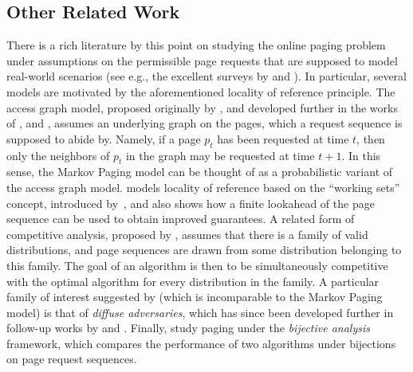 \subsection{Other Related Work}
\label{sec:related-work}



There is a rich literature by this point on studying the online paging problem under assumptions on the permissible page requests that are supposed to model real-world scenarios (see e.g., the excellent surveys by \cite{irani2005competitive} and \cite{dorrigiv2005survey}). In particular, several models are motivated by the aforementioned locality of reference principle. The access graph model, proposed originally by \cite{borodin1991competitive}, and developed further in the works of \cite{irani1992strongly}, \cite{fiat1995randomized} and \cite{fiat1997truly}, assumes an underlying graph on the pages, which a request sequence is supposed to abide by. Namely, if a page $p_t$ has been requested at time $t$, then only the neighbors of $p_t$ in the graph may be requested at time $t+1$. In this sense, the Markov Paging model can be thought of as a probabilistic variant of the access graph model.
\cite{torng1998unified} models locality of reference based on the ``working sets'' concept, introduced by~\cite{denning1968working}, and also shows how a finite lookahead of the page sequence can be used to obtain improved guarantees. A related form of competitive analysis, proposed by \cite{koutsoupias2000beyond}, assumes that there is a family of valid distributions, and page sequences are drawn from some distribution belonging to this family. The goal of an algorithm is then to be simultaneously competitive with the optimal algorithm for every distribution in the family. A particular family of interest suggested by \cite{koutsoupias2000beyond} (which is incomparable to the Markov Paging model) is that of \textit{diffuse adversaries}, which has since been developed further in follow-up works by \cite{young1998bounding, young2000line} and \cite{becchetti2004modeling}. Finally, \cite{angelopoulos2009paging} study paging under the \textit{bijective analysis} framework, which compares the performance of two algorithms under bijections on page request sequences.




